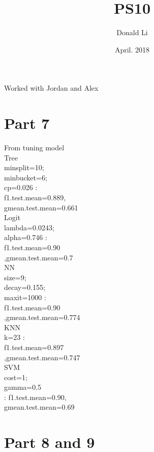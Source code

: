 \documentclass{article}
\title{PS10}
\author{Donald Li }
\date{April. 2018}
\begin{document}
\maketitle
Worked with Jordan and Alex
\section{Part 7}
From tuning model\\

Tree\\
minsplit=10;\\ 
minbucket=6; \\
cp=0.026 : \\
f1.test.mean=0.889,\\
gmean.test.mean=0.661\\


Logit \\
lambda=0.0243;\\
alpha=0.746 :\\
f1.test.mean=0.90\\
,gmean.test.mean=0.7\\



NN\\
size=9; \\
decay=0.155; \\
maxit=1000 :\\
f1.test.mean=0.90\\
,gmean.test.mean=0.774\\


KNN\\
 k=23 :\\
 f1.test.mean=0.897\\
 ,gmean.test.mean=0.747\\

 
 
 
SVM\\
cost=1; \\
gamma=0.5 \\
: f1.test.mean=0.90,\\
gmean.test.mean=0.69\\



\section{Part 8 and 9}
\end{document}
